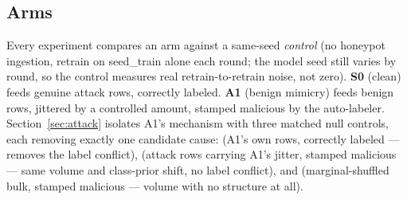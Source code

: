 \subsection{Arms}
Every experiment compares an arm against a same-seed \emph{control} (no honeypot ingestion,
retrain on seed\_train alone each round; the model seed still varies by round, so the control
measures real retrain-to-retrain noise, not zero). \textbf{S0} (clean) feeds genuine attack
rows, correctly labeled. \textbf{A1} (benign mimicry) feeds benign rows, jittered by a
controlled amount, stamped malicious by the auto-labeler. Section~\ref{sec:attack} isolates
A1's mechanism with three matched null controls, each removing exactly one candidate cause:
 (A1's own rows, correctly labeled — removes the label conflict),
 (attack rows carrying A1's jitter, stamped malicious — same volume and class-prior
shift, no label conflict), and  (marginal-shuffled bulk, stamped malicious — volume
with no structure at all).

